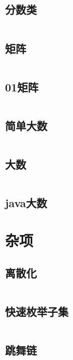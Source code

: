 \subsection{分数类} 

\inputminted{cpp}{code/Fraction.cc}

\subsection{矩阵} 

\inputminted{cpp}{code/Matrix.cc}

\subsection{01矩阵} 

\inputminted{cpp}{code/Matrix01.cc}

\subsection{简单大数} 

\inputminted{text}{code/DataAnalysis.cc }

\subsection{大数} 

\inputminted{cpp}{code/Bignum.cc}

\subsection{java大数} 



\section{杂项} 
\subsection{离散化} 

\inputminted{cpp}{code/discretization.cc}

\subsection{快速枚举子集} 

\inputminted{cpp}{code/EnumSubset.cc}

\subsection{跳舞链} 


